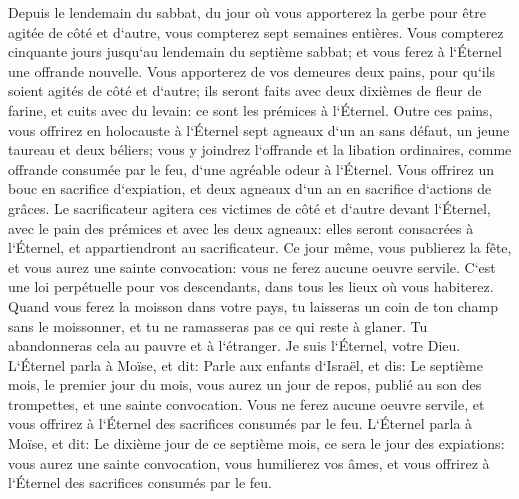 \verse Depuis le lendemain du sabbat, du jour où vous apporterez la gerbe pour être agitée de côté et d`autre, vous compterez sept semaines entières. 
\verse Vous compterez cinquante jours jusqu`au lendemain du septième sabbat; et vous ferez à l`Éternel une offrande nouvelle. 
\verse Vous apporterez de vos demeures deux pains, pour qu`ils soient agités de côté et d`autre; ils seront faits avec deux dixièmes de fleur de farine, et cuits avec du levain: ce sont les prémices à l`Éternel. 
\verse Outre ces pains, vous offrirez en holocauste à l`Éternel sept agneaux d`un an sans défaut, un jeune taureau et deux béliers; vous y joindrez l`offrande et la libation ordinaires, comme offrande consumée par le feu, d`une agréable odeur à l`Éternel. 
\verse Vous offrirez un bouc en sacrifice d`expiation, et deux agneaux d`un an en sacrifice d`actions de grâces. 
\verse Le sacrificateur agitera ces victimes de côté et d`autre devant l`Éternel, avec le pain des prémices et avec les deux agneaux: elles seront consacrées à l`Éternel, et appartiendront au sacrificateur. 
\verse Ce jour même, vous publierez la fête, et vous aurez une sainte convocation: vous ne ferez aucune oeuvre servile. C`est une loi perpétuelle pour vos descendants, dans tous les lieux où vous habiterez. 
\verse Quand vous ferez la moisson dans votre pays, tu laisseras un coin de ton champ sans le moissonner, et tu ne ramasseras pas ce qui reste à glaner. Tu abandonneras cela au pauvre et à l`étranger. Je suis l`Éternel, votre Dieu. 
\verse L`Éternel parla à Moïse, et dit: 
\verse Parle aux enfants d`Israël, et dis: Le septième mois, le premier jour du mois, vous aurez un jour de repos, publié au son des trompettes, et une sainte convocation. 
\verse Vous ne ferez aucune oeuvre servile, et vous offrirez à l`Éternel des sacrifices consumés par le feu. 
\verse L`Éternel parla à Moïse, et dit: 
\verse Le dixième jour de ce septième mois, ce sera le jour des expiations: vous aurez une sainte convocation, vous humilierez vos âmes, et vous offrirez à l`Éternel des sacrifices consumés par le feu. 
